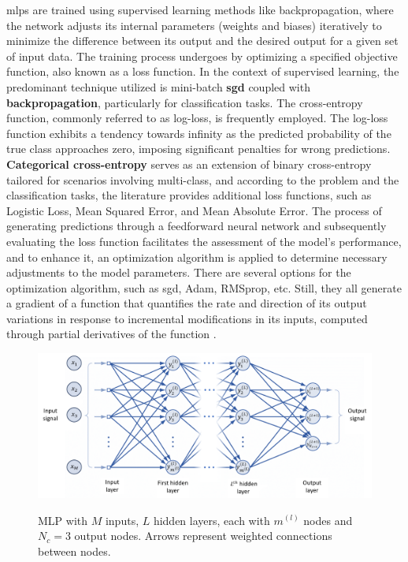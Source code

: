 \gls{mlp}s are trained using supervised learning methods like backpropagation, where the network adjusts its internal parameters (weights and biases) iteratively to minimize the difference between its output and the desired output for a given set of input data. The training process undergoes by optimizing a specified objective function, also known as a loss function. In the context of supervised learning, the predominant technique utilized is mini-batch \textbf{\gls{sgd}} coupled with \textbf{backpropagation}, particularly for classification tasks. The cross-entropy function, commonly referred to as log-loss, is frequently employed. The log-loss function exhibits a tendency towards infinity as the predicted probability of the true class approaches zero, imposing significant penalties for wrong predictions. \textbf{Categorical cross-entropy} serves as an extension of binary cross-entropy tailored for scenarios involving multi-class, and according to the problem and the classification tasks, the literature provides additional loss functions, such as Logistic Loss, Mean Squared Error, and Mean Absolute Error. The process of generating predictions through a feedforward neural network and subsequently evaluating the loss function facilitates the assessment of the model's performance, and to enhance it, an optimization algorithm is applied to determine necessary adjustments to the model parameters. There are several options for the optimization algorithm, such as \gls{sgd}, Adam, RMSprop, etc. Still, they all generate a gradient of a function that quantifies the rate and direction of its output variations in response to incremental modifications in its inputs, computed through partial derivatives of the function \cite{Bishop2023}. 

\begin{figure}[htbp]
    \raggedright
        \caption{MLP with $M$ inputs, $L$ hidden layers, each with $m^{(l)}$ nodes and $N_c = 3$ output nodes. Arrows represent weighted connections between nodes.}
        \includegraphics[width=1\textwidth]{resources/images/030-theoretical_framework/Framework_ann_mlp.png}
        \label{fig:frmwk_ann_mlp}
\end{figure}

